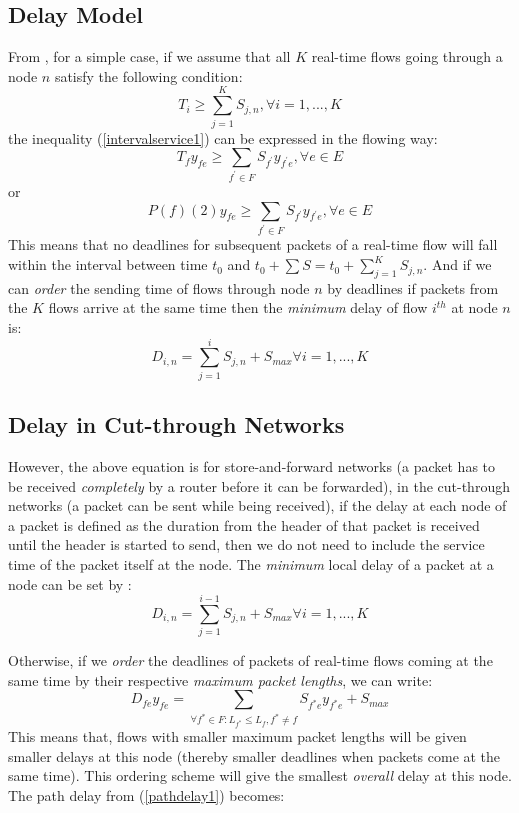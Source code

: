 \documentclass[10pt]{article}
\begin{document}
\subsection{Delay Model}
From \cite{Ferrari90ascheme}, for a simple case, if we assume that all $K$ 
real-time flows going through a node $n$ satisfy the following condition:
\begin{equation}\label{intervalservice1}
T_i \geq \sum_{j=1}^KS_{j,n}, \forall i = 1,...,K
\end{equation}
the inequality (\ref{intervalservice1}) can be expressed in the flowing way:
\begin{equation}
T_f y_{fe}\geq \sum_{f^{'} \in F} S_{f^{'}}y_{f^{'}e}, \forall e \in E
\end{equation}
or
\begin{equation}
P(f)(2) y_{fe}\geq \sum_{f^{'} \in F} S_{f^{'}}y_{f^{'}e}, \forall e \in E
\end{equation}
This means that no deadlines for subsequent packets of a real-time flow will fall within the interval 
between time $t_0$ and $t_0 + \sum S = t_0 + \sum_{j=1}^KS_{j,n}$. And if we can {\em order} the 
sending time of flows through node $n$ by deadlines if packets
from the $K$ flows arrive at the same time then the {\em minimum} delay of flow $i^{th}$ at 
node $n$ is:
\begin{equation}
D_{i,n} = \sum_{j=1}^iS_{j,n}+S_{max} \forall i = 1, ..., K
\end{equation}

\subsection{Delay in Cut-through Networks}
However, the above equation is for store-and-forward networks \cite{DallyPrinNetwork} (a packet has to be
received {\em completely} by a router before it can be forwarded), in the cut-through 
networks (a packet can be sent while being received), if the delay at each node of a packet is defined as the duration from the header of that  packet
is received until the header is started to send, then we do not need to include
the service time of the packet itself at the node. The {\em minimum} local delay of 
a packet at a node can be set by :
\begin{equation}\label{nodedelay1}
D_{i,n} = \sum_{j=1}^{i-1}S_{j,n}+S_{max} \forall i = 1, ..., K
\end{equation}

Otherwise, if we {\em order} the deadlines of packets of real-time flows coming at
the same time by their respective {\em maximum packet lengths}, we can write:
\begin{equation}\label{nodedelay2}
D_{fe}y_{fe} = \sum_{\forall f^{*} \in F: L_{f^{*}} \leq  L_{f}, f^{*}\neq f }S_{f^{*}e}y_{f^{*}e}+S_{max}
\end{equation}
This means that, flows with smaller maximum packet lengths will be given smaller delays
at this node (thereby smaller deadlines when packets come at the same time). This ordering scheme 
will give the smallest {\em overall} delay at this node.
The path delay from (\ref{pathdelay1}) becomes:
\end{document}
